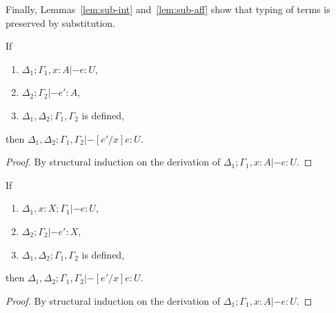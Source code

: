 Finally, Lemmas~\ref{lem:sub-int} and~\ref{lem:sub-aff} show that typing of
terms is preserved by substitution.

\begin{lemma}\label{lem:sub-int}
  If
  \begin{enumerate}
  \item $\Delta_1; \Gamma_1, x : A |- e : U$,
  \item $\Delta_2; \Gamma_2 |- e' : A$,
  \item $\Delta_1,\Delta_2 ; \Gamma_1,\Gamma_2$ is defined,
  \end{enumerate}
  then $\Delta_1,\Delta_2; \Gamma_1,\Gamma_2 |- [e'/x]e : U$.
  \begin{proof}
    By structural induction on the derivation of $\Delta_1; \Gamma_1, x : A |- e : U$.
  \end{proof}
\end{lemma}

\begin{lemma}\label{lem:sub-aff}
  If
  \begin{enumerate}
  \item $\Delta_1, x : X; \Gamma_1 |- e : U$,
  \item $\Delta_2; \Gamma_2 |- e' : X$,
  \item $\Delta_1,\Delta_2 ; \Gamma_1,\Gamma_2$ is defined,
  \end{enumerate}
  then $\Delta_1,\Delta_2; \Gamma_1,\Gamma_2 |- [e'/x]e : U$.
  \begin{proof}
    By structural induction on the derivation of $\Delta_1; \Gamma_1, x : A |- e : U$.
  \end{proof}
\end{lemma}



